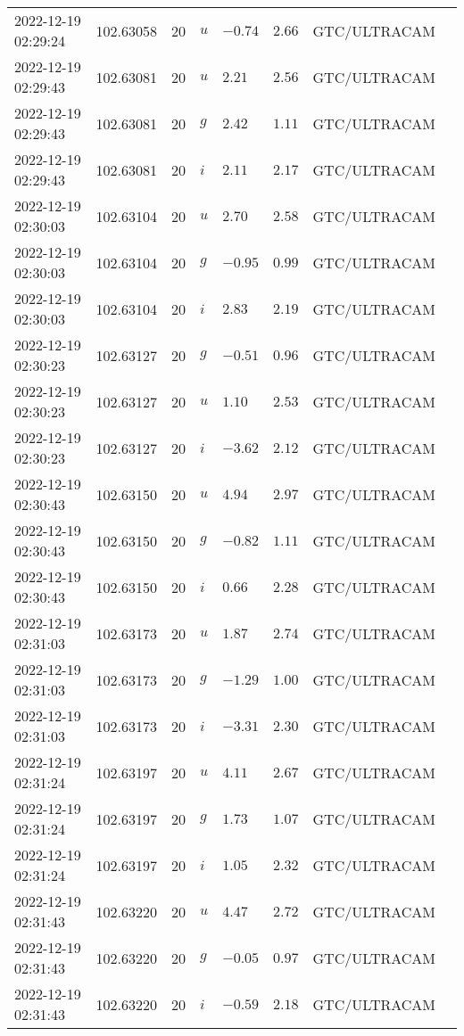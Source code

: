 \documentclass{nature_plusfigure}
\begin{document}
\begin{supplement}
\begin{center}
\begin{longtable}{llllllll}
2022-12-19 02:29:24 & 102.63058 & 20 & $u$ & $-0.74$ & $2.66$ & GTC/ULTRACAM &  \\ 
2022-12-19 02:29:43 & 102.63081 & 20 & $u$ & $2.21$ & $2.56$ & GTC/ULTRACAM &  \\ 
2022-12-19 02:29:43 & 102.63081 & 20 & $g$ & $2.42$ & $1.11$ & GTC/ULTRACAM &  \\ 
2022-12-19 02:29:43 & 102.63081 & 20 & $i$ & $2.11$ & $2.17$ & GTC/ULTRACAM &  \\ 
2022-12-19 02:30:03 & 102.63104 & 20 & $u$ & $2.70$ & $2.58$ & GTC/ULTRACAM &  \\ 
2022-12-19 02:30:03 & 102.63104 & 20 & $g$ & $-0.95$ & $0.99$ & GTC/ULTRACAM &  \\ 
2022-12-19 02:30:03 & 102.63104 & 20 & $i$ & $2.83$ & $2.19$ & GTC/ULTRACAM &  \\ 
2022-12-19 02:30:23 & 102.63127 & 20 & $g$ & $-0.51$ & $0.96$ & GTC/ULTRACAM &  \\ 
2022-12-19 02:30:23 & 102.63127 & 20 & $u$ & $1.10$ & $2.53$ & GTC/ULTRACAM &  \\ 
2022-12-19 02:30:23 & 102.63127 & 20 & $i$ & $-3.62$ & $2.12$ & GTC/ULTRACAM &  \\ 
2022-12-19 02:30:43 & 102.63150 & 20 & $u$ & $4.94$ & $2.97$ & GTC/ULTRACAM &  \\ 
2022-12-19 02:30:43 & 102.63150 & 20 & $g$ & $-0.82$ & $1.11$ & GTC/ULTRACAM &  \\ 
2022-12-19 02:30:43 & 102.63150 & 20 & $i$ & $0.66$ & $2.28$ & GTC/ULTRACAM &  \\ 
2022-12-19 02:31:03 & 102.63173 & 20 & $u$ & $1.87$ & $2.74$ & GTC/ULTRACAM &  \\ 
2022-12-19 02:31:03 & 102.63173 & 20 & $g$ & $-1.29$ & $1.00$ & GTC/ULTRACAM &  \\ 
2022-12-19 02:31:03 & 102.63173 & 20 & $i$ & $-3.31$ & $2.30$ & GTC/ULTRACAM &  \\ 
2022-12-19 02:31:24 & 102.63197 & 20 & $u$ & $4.11$ & $2.67$ & GTC/ULTRACAM &  \\ 
2022-12-19 02:31:24 & 102.63197 & 20 & $g$ & $1.73$ & $1.07$ & GTC/ULTRACAM &  \\ 
2022-12-19 02:31:24 & 102.63197 & 20 & $i$ & $1.05$ & $2.32$ & GTC/ULTRACAM &  \\ 
2022-12-19 02:31:43 & 102.63220 & 20 & $u$ & $4.47$ & $2.72$ & GTC/ULTRACAM &  \\ 
2022-12-19 02:31:43 & 102.63220 & 20 & $g$ & $-0.05$ & $0.97$ & GTC/ULTRACAM &  \\ 
2022-12-19 02:31:43 & 102.63220 & 20 & $i$ & $-0.59$ & $2.18$ & GTC/ULTRACAM &  \\ 

\end{longtable}
\end{center}
\end{supplement}
\end{document}
